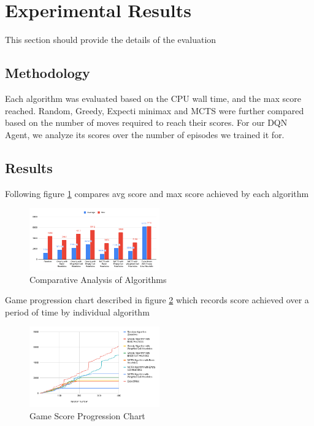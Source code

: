 \documentclass{svproc}
\begin{document}
    \section{Experimental Results}
    This section should provide the details of the evaluation

    \subsection{Methodology}
    Each algorithm was evaluated based on the CPU wall time, and the max score reached. Random, Greedy, Expecti minimax and MCTS were further compared based on the number of moves required to reach their scores. For our DQN Agent, we analyze its scores over the number of episodes we trained it for.
    \subsection{Results}

    Following figure \ref{comparative_analysis_of_algorithms} compares avg score and max score achieved by each algorithm

    \begin{figure}[h!]

        \centering
        \includegraphics[width=0.5\textwidth]{Comparative Analysis.png}
        \caption{Comparative Analysis of Algorithms}
        \label{comparative_analysis_of_algorithms}
    \end{figure}

    Game progression chart described in figure \ref{game_score_progression_chart} which records score achieved over a period of time by individual algorithm

    \begin{figure}[h!]

        \centering
        \includegraphics[width=0.5\textwidth]{Game Score Progression Chart.png}
        \caption{Game Score Progression Chart}
        \label{game_score_progression_chart}
    \end{figure}
\end{document}
